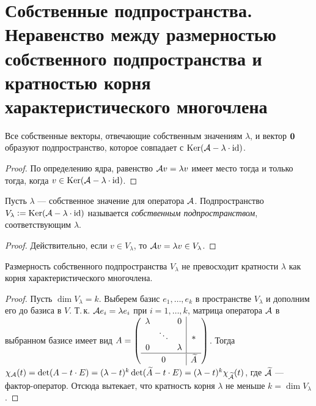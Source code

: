 \section{Собственные подпространства. Неравенство между размерностью собственного подпространства и кратностью корня характеристического многочлена}

\begin{proposal}
    Все собственные векторы, отвечающие собственным значениям $\lambda$, и вектор $\boldsymbol{0}$ образуют подпространство, которое совпадает с $\operatorname{Ker}(\mathcal{A} - \lambda \cdot \operatorname{id})$.
\end{proposal}

\begin{proof}
    По определению ядра, равенство $\mathcal{A} v = \lambda v$ имеет место тогда и только тогда, когда $v \in \operatorname{Ker}(\mathcal{A} - \lambda \cdot \operatorname{id})$.
\end{proof}

\begin{definition}
    Пусть $\lambda$ --- собственное значение для оператора $\mathcal{A}$. Подпространство $V_\lambda \vcentcolon = \operatorname{Ker}(\mathcal{A} - \lambda \cdot \operatorname{id})$ называется \textit{собственным подпространством}, соответствующим $\lambda$.
\end{definition}

\begin{proof}
    Действительно, если $v \in V_\lambda$, то $\mathcal{A} v = \lambda v \in V_\lambda$.
\end{proof}

\begin{proposal}
    Размерность собственного подпространства $V_\lambda$ не превосходит кратности $\lambda$ как корня характеристического многочлена.
\end{proposal}

\begin{proof}
    Пусть $\dim V_\lambda = k$. Выберем базис $e_1, \ldots, e_k$ в пространстве $V_\lambda$ и дополним его до базиса в $V$. Т.\,к. $\mathcal{A} e_i = \lambda e_i$ при $i = 1, \ldots, k$, матрица оператора $\mathcal{A}$ в выбранном базисе имеет вид
    $
    A = 
    \left(
    \begin{array}{c c c | c}
        \lambda & & 0 & \\
         & \ddots & & \ast\\
        0 & & \lambda & \\
        \hline\vspace{-4mm}\\
         & 0 & & \widetilde{A}
    \end{array}
    \right)
    $. Тогда $\chi_{\mathcal{A}}(t) = \det(A - t \cdot E) = (\lambda - t)^k\det(\widetilde{A} - t \cdot E) = (\lambda - t)^k\chi_{\widetilde{\mathcal{A}}}(t)$, где $\widetilde{\mathcal{A}}$ --- фактор-оператор. Отсюда вытекает, что кратность корня $\lambda$ не меньше $k = \dim V_\lambda$.
\end{proof}

